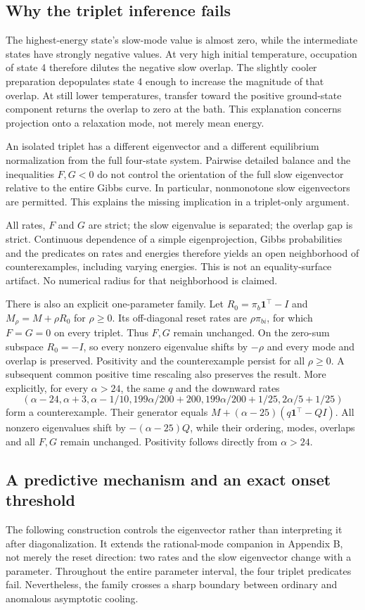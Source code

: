 \documentclass[11pt]{article}
\begin{document}
\subsection{Why the triplet inference fails}
The highest-energy state's slow-mode value is almost zero, while the intermediate states have strongly negative values. At very high initial temperature, occupation of state 4 therefore dilutes the negative slow overlap. The slightly cooler preparation depopulates state 4 enough to increase the magnitude of that overlap. At still lower temperatures, transfer toward the positive ground-state component returns the overlap to zero at the bath. This explanation concerns projection onto a relaxation mode, not merely mean energy.

An isolated triplet has a different eigenvector and a different equilibrium normalization from the full four-state system. Pairwise detailed balance and the inequalities $F,G<0$ do not control the orientation of the full slow eigenvector relative to the entire Gibbs curve. In particular, nonmonotone slow eigenvectors are permitted. This explains the missing implication in a triplet-only argument.

All rates, $F$ and $G$ are strict; the slow eigenvalue is separated; the overlap gap is strict. Continuous dependence of a simple eigenprojection, Gibbs probabilities and the predicates on rates and energies therefore yields an open neighborhood of counterexamples, including varying energies. This is not an equality-surface artifact. No numerical radius for that neighborhood is claimed.

There is also an explicit one-parameter family. Let $R_0=\pi_b\mathbf1^\top-I$ and $M_\rho=M+\rho R_0$ for $\rho\geq0$. Its off-diagonal reset rates are $\rho\pi_{bi}$, for which $F=G=0$ on every triplet. Thus $F,G$ remain unchanged. On the zero-sum subspace $R_0=-I$, so every nonzero eigenvalue shifts by $-\rho$ and every mode and overlap is preserved. Positivity and the counterexample persist for all $\rho\geq0$. A subsequent common positive time rescaling also preserves the result. More explicitly, for every $\alpha>24$, the same $q$ and the downward rates
\[
(\alpha-24,\alpha+3,\alpha-1/10,
199\alpha/200+200,199\alpha/200+1/25,2\alpha/5+1/25)
\]
form a counterexample. Their generator equals $M+(\alpha-25)(q\mathbf1^\top-QI)$. All nonzero eigenvalues shift by $-(\alpha-25)Q$, while their ordering, modes, overlaps and all $F,G$ remain unchanged. Positivity follows directly from $\alpha>24$.

\subsection{A predictive mechanism and an exact onset threshold}\label{sec:mechanism}
The following construction controls the eigenvector rather than interpreting it after diagonalization. It extends the rational-mode companion in Appendix B, not merely the reset direction: two rates and the slow eigenvector change with a parameter. Throughout the entire parameter interval, the four triplet predicates fail. Nevertheless, the family crosses a sharp boundary between ordinary and anomalous asymptotic cooling.
\end{document}
